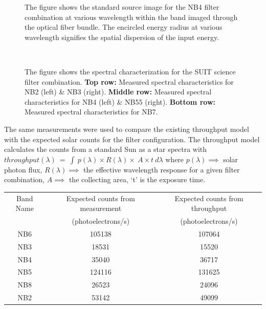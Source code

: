 \documentclass[a4paper,11pt]{article}
\begin{document}
\begin{figure}[ht!]
    \centering
    
    \caption{The figure shows the standard source image for the NB4 filter combination at various wavelength within the band imaged through the optical fiber bundle. The encircled energy radius at various wavelength signifies the spatial dispersion of the input energy.}
    \label{fig:nb4-im}
\end{figure}

\begin{figure}[ht!]
    \centering
    
    \\
    
    
    
    \caption{The figure shows the spectral characterization for the SUIT science filter combination. \textbf{Top row:} Measured spectral characteristics for NB2 (left) \& NB3 (right). \textbf{Middle row:} Measured spectral characteristics for NB4 (left) \& NB55 (right). \textbf{Bottom row:} Measured spectral characteristics for NB7.}
    \label{fig:filt-spec}
\end{figure}

The same measurements were used to compare the existing throughput model with the expected solar counts for the filter configuration. The throughput model calculates the counts from a standard Sun as a star spectra with $throughput(\lambda)~=~\int~p(\lambda)\times R(\lambda)\times~A\times t~d\lambda$ where $p(\lambda)\implies$ solar photon flux, $R(\lambda)\implies$ the effective wavelength response for a given filter combination, $A\implies$ the collecting area, `t' is the exposure time. 

\begin{tabular}{||c|c|c||}
\hline
    Band Name & Expected counts from measurement & Expected counts from throughput \\
              & (photoelectrons/s) &  (photoelectrons/s) \\
\hline
  NB6 & 105138 & 107064 \\
  NB3 & 18531 & 15520 \\
  NB4 & 35040 & 36717 \\
  NB5 & 124116 & 131625 \\
  NB8 & 26523 & 24096 \\
  NB2 & 53142 & 49099 \\
\hline
\end{tabular}
\end{document}
